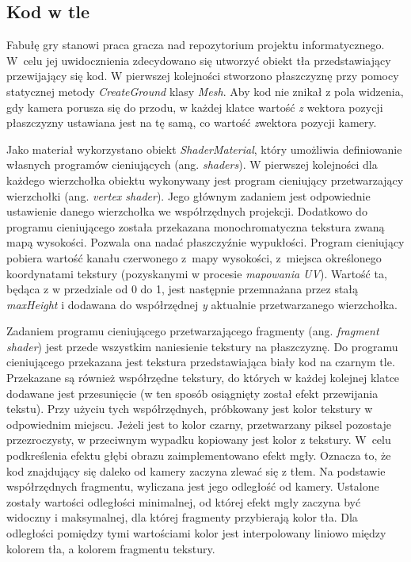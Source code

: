 \documentclass[12pt,a4paper,polish,thesis]{dcsbook}
\begin{document}
{	\subsection{Kod w tle}

	Fabułę gry stanowi praca gracza nad repozytorium projektu informatycznego. W~celu jej uwidocznienia zdecydowano się utworzyć obiekt tła przedstawiający przewijający się kod. W pierwszej kolejności stworzono płaszczyznę przy pomocy statycznej metody \textit{CreateGround} klasy \textit{Mesh}. Aby kod nie znikał z pola widzenia, gdy kamera porusza się do przodu, w każdej klatce wartość \textit{z} wektora pozycji płaszczyzny ustawiana jest na tę samą, co wartość \textit{z}wektora pozycji kamery.
	
	Jako materiał wykorzystano obiekt \textit{ShaderMaterial}, który umożliwia definiowanie własnych programów cieniujących (ang. \textit{shaders}). W pierwszej kolejności dla każdego wierzchołka obiektu wykonywany jest program cieniujący przetwarzający wierzchołki (ang. \textit{vertex shader}). Jego głównym zadaniem jest odpowiednie ustawienie danego wierzchołka we współrzędnych projekcji. Dodatkowo do programu cieniującego została przekazana monochromatyczna tekstura zwaną mapą wysokości. Pozwala ona nadać płaszczyźnie wypukłości. Program cieniujący pobiera wartość kanału czerwonego z~mapy wysokości, z~miejsca określonego koordynatami tekstury (pozyskanymi w procesie \textit{mapowania UV}). Wartość ta, będąca z w przedziale od 0 do 1, jest następnie przemnażana przez stałą \textit{maxHeight} i dodawana do współrzędnej \textit{y} aktualnie przetwarzanego wierzchołka.
	
	Zadaniem programu cieniującego przetwarzającego fragmenty (ang. \textit{fragment shader}) jest przede wszystkim naniesienie tekstury na płaszczyznę. Do programu cieniującego przekazana jest tekstura przedstawiająca biały kod na czarnym tle. Przekazane są również współrzędne tekstury, do których w każdej kolejnej klatce dodawane jest przesunięcie (w ten sposób osiągnięty został efekt przewijania tekstu). Przy użyciu tych współrzędnych, próbkowany jest kolor tekstury w odpowiednim miejscu. Jeżeli jest to kolor czarny, przetwarzany piksel pozostaje przezroczysty, w przeciwnym wypadku kopiowany jest kolor z tekstury. W~celu podkreślenia efektu głębi obrazu zaimplementowano efekt mgły. Oznacza to, że kod znajdujący się daleko od kamery zaczyna zlewać się z tłem. Na podstawie współrzędnych fragmentu, wyliczana jest jego odległość od kamery. Ustalone zostały wartości odległości minimalnej, od której efekt mgły zaczyna być widoczny i maksymalnej, dla której fragmenty przybierają kolor tła. Dla odległości pomiędzy tymi wartościami kolor jest interpolowany liniowo między kolorem tła, a kolorem fragmentu tekstury.

}
\end{document}
